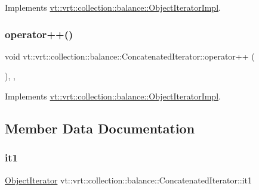 Implements \hyperlink{structvt_1_1vrt_1_1collection_1_1balance_1_1_object_iterator_impl_a361451a08b7d2361ee9f0e5b3c35c089}{vt\+::vrt\+::collection\+::balance\+::\+Object\+Iterator\+Impl}.

\mbox{\label{structvt_1_1vrt_1_1collection_1_1balance_1_1_concatenated_iterator_aa89d0b18e2595bda59867f3254658125}} 
\subsubsection{\texorpdfstring{operator++()}{operator++()}}
{\footnotesize\ttfamily void vt\+::vrt\+::collection\+::balance\+::\+Concatenated\+Iterator\+::operator++ (\begin{DoxyParamCaption}{ }\end{DoxyParamCaption})\hspace{0.3cm}{\ttfamily [inline]}, {\ttfamily [override]}, {\ttfamily [virtual]}}



Implements \hyperlink{structvt_1_1vrt_1_1collection_1_1balance_1_1_object_iterator_impl_ab59b65c6a22626b6d2d3ab283309ac1f}{vt\+::vrt\+::collection\+::balance\+::\+Object\+Iterator\+Impl}.



\subsection{Member Data Documentation}
\mbox{\label{structvt_1_1vrt_1_1collection_1_1balance_1_1_concatenated_iterator_aee45a94631e680103b90c565053ff798}} 
\subsubsection{\texorpdfstring{it1}{it1}}
{\footnotesize\ttfamily \hyperlink{structvt_1_1vrt_1_1collection_1_1balance_1_1_object_iterator}{Object\+Iterator} vt\+::vrt\+::collection\+::balance\+::\+Concatenated\+Iterator\+::it1}

